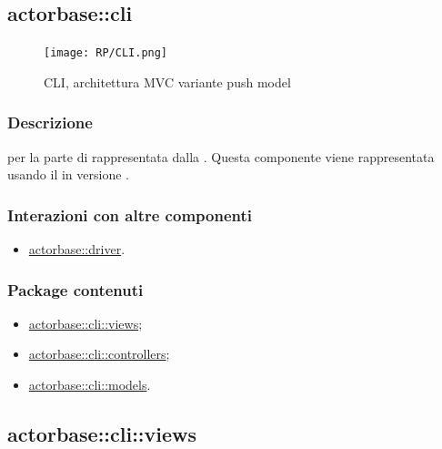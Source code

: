 \documentclass{scalatekids-article}
\begin{document}

\subsection{actorbase::cli}
\label{sec:actorbase::cli}

\begin{figure}[H]
  \begin{center}
    \texttt{[image: RP/CLI.png]}
    \caption{CLI, architettura MVC variante push model}
  \end{center}
\end{figure}

\subsubsection{Descrizione}

 per la parte di  rappresentata dalla .
Questa componente viene rappresentata usando il 
 in versione .

\subsubsection{Interazioni con altre componenti}

\begin{itemize}
\item \hyperref[sec:actorbase::driver]{actorbase::driver}.
\end{itemize}

\subsubsection{Package contenuti}

\begin{itemize}
\item \hyperref[sec:actorbase::cli::views]{actorbase::cli::views};
\item \hyperref[sec:actorbase::cli::controllers]{actorbase::cli::controllers};
\item \hyperref[sec:actorbase::cli::models]{actorbase::cli::models}.
\end{itemize}

\subsection{actorbase::cli::views}
\label{sec:actorbase::cli::views}
\end{document}
